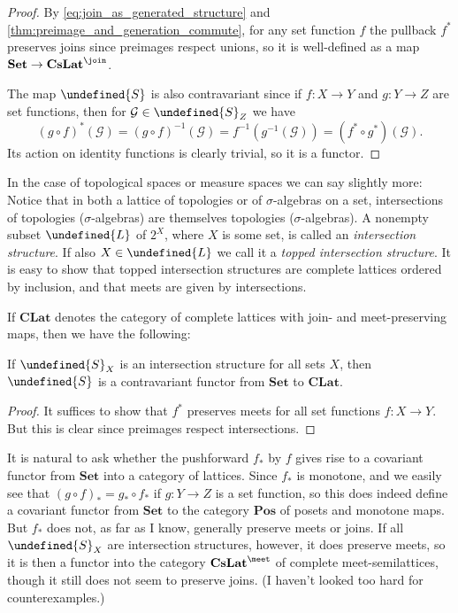 \documentclass[article, a4paper, 11pt, oneside]{memoir}
\let\mathfrak\undefined
\numberwithin{equation}{chapter}
\newcommand{\calG}{\mathcal{G}}
\newcommand{\strucS}{\mathfrak{S}}
\newcommand{\frakL}{\mathfrak{L}}
\newcommand{\ncat}[1]{\mathbf{#1}} %
\newcommand{\catSet}{\ncat{Set}} %
\newcommand{\catPos}{\ncat{Pos}} %
\newcommand{\catCLat}{\ncat{CLat}} %
\newcommand{\catCJoinLat}{\ncat{CsLat}^{\join}} %
\newcommand{\catCMeetLat}{\ncat{CsLat}^{\meet}} %
\begin{document}
\begin{proof}
    By \eqref{eq:join_as_generated_structure} and \cref{thm:preimage_and_generation_commute}, for any set function $f$ the pullback $f^*$ preserves joins since preimages respect unions, so it is well-defined as a map $\catSet \to \catCJoinLat$.
    
    The map $\strucS$ is also contravariant since if $f \colon X \to Y$ and $g \colon Y \to Z$ are set functions, then for $\calG \in \strucS_Z$ we have
    \begin{equation*}
        (g \circ f)^*(\calG)
            = (g \circ f)^{-1}(\calG)
            = f^{-1}(g^{-1}(\calG))
            = (f^* \circ g^*) (\calG).
    \end{equation*}
    Its action on identity functions is clearly trivial, so it is a functor.
\end{proof}

In the case of topological spaces or measure spaces we can say slightly more: Notice that in both a lattice of topologies or of $\sigma$-algebras on a set, intersections of topologies ($\sigma$-algebras) are themselves topologies ($\sigma$-algebras). A nonempty subset $\frakL$ of $2^X$, where $X$ is some set, is called an \emph{intersection structure}. If also $X \in \frakL$ we call it a \emph{topped intersection structure}. It is easy to show that topped intersection structures are complete lattices ordered by inclusion, and that meets are given by intersections.

If $\catCLat$ denotes the category of complete lattices with join- and meet-preserving maps, then we have the following:

\begin{proposition}[Functoriality of $\strucS$, II]
    If $\strucS_X$ is an intersection structure for all sets $X$, then $\strucS$ is a contravariant functor from $\catSet$ to $\catCLat$.
\end{proposition}

\begin{proof}
    It suffices to show that $f^*$ preserves meets for all set functions $f \colon X \to Y$. But this is clear since preimages respect intersections.
\end{proof}

It is natural to ask whether the pushforward $f_*$ by $f$ gives rise to a covariant functor from $\catSet$ into a category of lattices. Since $f_*$ is monotone, and we easily see that $(g \circ f)_* = g_* \circ f_*$ if $g \colon Y \to Z$ is a set function, so this does indeed define a covariant functor from $\catSet$ to the category $\catPos$ of posets and monotone maps. But $f_*$ does not, as far as I know, generally preserve meets or joins. If all $\strucS_X$ are intersection structures, however, it does preserve meets, so it is then a functor into the category $\catCMeetLat$ of complete meet-semilattices, though it still does not seem to preserve joins. (I haven't looked too hard for counterexamples.)
\end{document}
